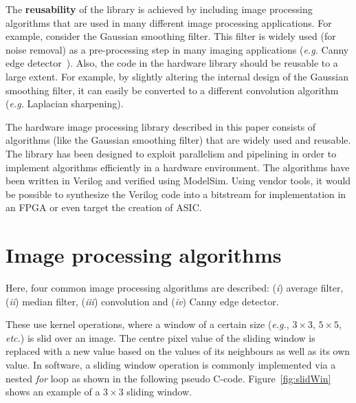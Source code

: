 \documentclass[10pt,twocolumn,letterpaper]{article}
\begin{document}
The {\bf reusability} of the library is achieved by including image processing algorithms that are used in many different image processing applications.
For example, consider the Gaussian smoothing filter. 
This filter is widely used (for noise removal) as a pre-processing step in many imaging applications (\emph{e.g.} Canny edge detector~\cite{russbk}).
Also, the code in the hardware library should be reusable to a large extent. 
For example, by slightly altering the internal design of the Gaussian smoothing filter,
it can easily be converted to a different convolution algorithm (\emph{e.g.} Laplacian sharpening).

The hardware image processing library described in this paper consists of algorithms (like the Gaussian smoothing filter) that are widely used and
reusable. The library has been designed to exploit parallelism and pipelining in order to implement algorithms efficiently in a hardware
environment. The algorithms have been written in Verilog and verified using ModelSim. Using vendor tools, it would be possible
to synthesize the Verilog code into a bitstream for implementation in an FPGA or even target the creation of ASIC. 



\section{Image processing algorithms}
Here, four common image processing algorithms are described:
(\emph{i}) average filter, (\emph{ii}) median filter, (\emph{iii}) convolution and
(\emph{iv}) Canny edge detector.

These use kernel operations, where
a window of a certain size (\emph{e.g.}, $3\times3$, $5\times5$, \emph{etc.})
is slid over an image. The centre pixel value of the sliding window is
replaced with a new value based on 
the values 
of its neighbours as well as its own value. 
In software, a sliding window operation is commonly implemented
via a nested \emph{for} loop as shown in the following pseudo C-code.
Figure~\ref{fig:slidWin} shows an example of a $3\times3$ sliding window.
\end{document}
